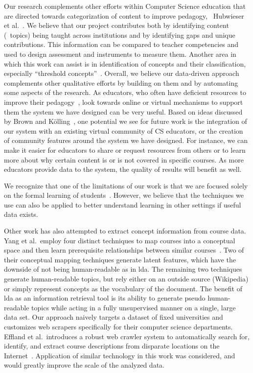 Our research complements other efforts within Computer Science education that are directed towards categorization of content to improve pedagogy, \eg\ Hubwieser et al.~\cite{hubwieser2013}.
We believe that our project contributes both by identifying content (\ie\ topics) being taught across institutions and by identifying gaps and unique contributions.
This information can be compared to teacher competencies and used to design assessment and instruments to measure them.
Another area in which this work can assist is in identification of concepts and their classification, especially ``threshold concepts''~\cite{ShinnersKennedyFincher2013}.
Overall, we believe our data-driven approach complements other qualitative efforts by building on them and by automating some aspects of the research.
As educators, who often have deficient resources to improve their pedagogy~\cite{Brown2013}, look towards online or virtual mechanisms to support them the system we have designed can be very useful.
Based on ideas discussed by Brown and K\"{o}lling~\cite{Brown2013}, one potential we see for future work is the integration of our system with an existing virtual community of CS educators, or the creation of community features around the system we have designed.
For instance, we can make it easier for educators to share or request resources from others or to learn more about why certain content is or is not covered in specific courses.
As more educators provide data to the system, the quality of results will benefit as well.


We recognize that one of the limitations of our work is that we are focused solely on the formal learning of students~\cite{Boustedt2011}.
However, we believe that the techniques we use can also be applied to better understand learning in other settings if useful data exists.


Other work has also attempted to extract concept information from course data.
Yang et al.\ employ four distinct techniques to map courses into a conceptual space and then learn prerequisite relationships between similar courses~\cite{Yang2015}.
Two of their conceptual mapping techniques generate latent features, which have the downside of not being human-readable as in \ac{lda}.
The remaining two techniques generate human-readable topics, but rely either on an outside source (Wikipedia) or simply represent concepts as the vocabulary of the document.
The benefit of \ac{lda} as an information retrieval tool is its ability to generate pseudo human-readable topics while acting in a fully unsupervised manner on a single, large data set.
Our approach naively targets a dataset of fixed universities and customizes web scrapers specifically for their computer science departments.
Effland et al.\ introduces a robust web crawler system to automatically search for, identify, and extract course descriptions from disparate locations on the Internet~\cite{Effland2015}.
Application of similar technology in this work was considered, and would greatly improve the scale of the analyzed data.


